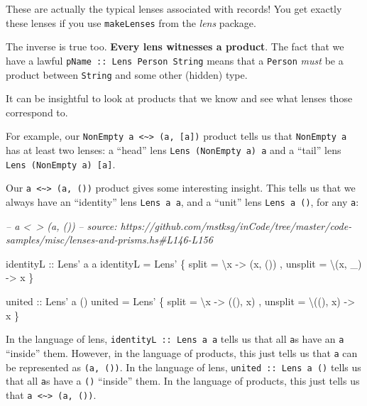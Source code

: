 \documentclass[]{article}
\newenvironment{Shaded}{}{}
\newcommand{\CommentTok}[1]{\textcolor[rgb]{0.38,0.63,0.69}{\textit{#1}}}
\newcommand{\DataTypeTok}[1]{\textcolor[rgb]{0.56,0.13,0.00}{#1}}
\newcommand{\FunctionTok}[1]{\textcolor[rgb]{0.02,0.16,0.49}{#1}}
\newcommand{\NormalTok}[1]{#1}
\newcommand{\OtherTok}[1]{\textcolor[rgb]{0.00,0.44,0.13}{#1}}
\begin{document}
These are actually the typical lenses associated with records! You get exactly
these lenses if you use \texttt{makeLenses} from the \emph{lens} package.

The inverse is true too. \textbf{Every lens witnesses a product}. The fact that
we have a lawful \texttt{pName\ ::\ Lens\textquotesingle{}\ Person\ String}
means that a \texttt{Person} \emph{must} be a product between \texttt{String}
and some other (hidden) type.

It can be insightful to look at products that we know and see what lenses those
correspond to.

For example, our
\texttt{NonEmpty\ a\ \textless{}\textasciitilde{}\textgreater{}\ (a,\ {[}a{]})}
product tells us that \texttt{NonEmpty\ a} has at least two lenses: a ``head''
lens \texttt{Lens\textquotesingle{}\ (NonEmpty\ a)\ a} and a ``tail'' lens
\texttt{Lens\textquotesingle{}\ (NonEmpty\ a)\ {[}a{]}}.

Our \texttt{a\ \textless{}\textasciitilde{}\textgreater{}\ (a,\ ())} product
gives some interesting insight. This tells us that we always have an
``identity'' lens \texttt{Lens\textquotesingle{}\ a\ a}, and a ``unit'' lens
\texttt{Lens\textquotesingle{}\ a\ ()}, for any \texttt{a}:

\begin{Shaded}
\begin{Highlighting}[]
\CommentTok{-- a <~> (a, ())}
\CommentTok{-- source: https://github.com/mstksg/inCode/tree/master/code-samples/misc/lenses-and-prisms.hs#L146-L156}

\OtherTok{identityL ::} \DataTypeTok{Lens'}\NormalTok{ a a}
\NormalTok{identityL }\FunctionTok{=} \DataTypeTok{Lens'}
\NormalTok{    \{ split   }\FunctionTok{=}\NormalTok{ \textbackslash{}x      }\OtherTok{->}\NormalTok{ (x, ())}
\NormalTok{    , unsplit }\FunctionTok{=}\NormalTok{ \textbackslash{}(x, _) }\OtherTok{->}\NormalTok{ x}
\NormalTok{    \}}

\OtherTok{united ::} \DataTypeTok{Lens'}\NormalTok{ a ()}
\NormalTok{united }\FunctionTok{=} \DataTypeTok{Lens'}
\NormalTok{    \{ split   }\FunctionTok{=}\NormalTok{ \textbackslash{}x       }\OtherTok{->}\NormalTok{ ((), x)}
\NormalTok{    , unsplit }\FunctionTok{=}\NormalTok{ \textbackslash{}((), x) }\OtherTok{->}\NormalTok{ x}
\NormalTok{    \}}
\end{Highlighting}
\end{Shaded}

In the language of lens, \texttt{identityL\ ::\ Lens\textquotesingle{}\ a\ a}
tells us that all \texttt{a}s have an \texttt{a} ``inside'' them. However, in
the language of products, this just tells us that \texttt{a} can be represented
as \texttt{(a,\ ())}. In the language of lens,
\texttt{united\ ::\ Lens\textquotesingle{}\ a\ ()} tells us that all \texttt{a}s
have a \texttt{()} ``inside'' them. In the language of products, this just tells
us that \texttt{a\ \textless{}\textasciitilde{}\textgreater{}\ (a,\ ())}.
\end{document}
